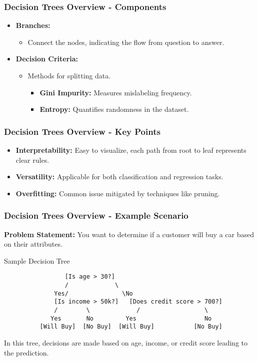\documentclass[aspectratio=169]{beamer}
\begin{document}
\begin{frame}[fragile]
    \frametitle{Decision Trees Overview - Components}
    \begin{itemize}
        \item \textbf{Branches:}
          \begin{itemize}
              \item Connect the nodes, indicating the flow from question to answer.
          \end{itemize}
        
        \item \textbf{Decision Criteria:}
          \begin{itemize}
              \item Methods for splitting data.
              \begin{itemize}
                  \item \textbf{Gini Impurity:} Measures mislabeling frequency.
                  \item \textbf{Entropy:} Quantifies randomness in the dataset.
              \end{itemize}
          \end{itemize}
    \end{itemize}
\end{frame}

\begin{frame}[fragile]
    \frametitle{Decision Trees Overview - Key Points}
    \begin{itemize}
        \item \textbf{Interpretability:} Easy to visualize, each path from root to leaf represents clear rules.
        \item \textbf{Versatility:} Applicable for both classification and regression tasks.
        \item \textbf{Overfitting:} Common issue mitigated by techniques like pruning.
    \end{itemize}
\end{frame}

\begin{frame}[fragile]
    \frametitle{Decision Trees Overview - Example Scenario}
    \textbf{Problem Statement:}
    You want to determine if a customer will buy a car based on their attributes.

    \begin{block}{Sample Decision Tree}
    \begin{verbatim}
                 [Is age > 30?]
                 /             \
              Yes/               \No
              [Is income > 50k?]   [Does credit score > 700?]
              /        \             /                  \
             Yes       No         Yes                   No
          [Will Buy]  [No Buy]  [Will Buy]           [No Buy]
    \end{verbatim}
    \end{block}

    In this tree, decisions are made based on age, income, or credit score leading to the prediction.
\end{frame}
\end{document}
